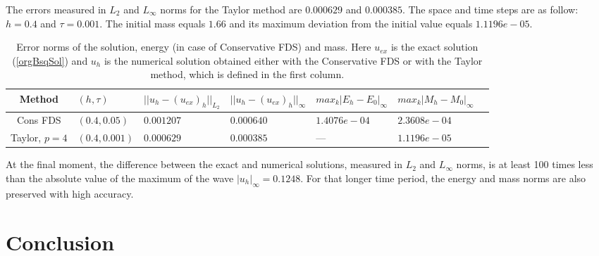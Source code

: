 \documentclass[%
 aip,
cp,  
 amsmath,amssymb,
 reprint,
]{iopconfser}
\newcommand{\rf}[1]{(\ref{#1})}
\begin{document}
The errors measured in $L_2$ and $L_\infty$ norms for the Taylor method are $0.000629$ and $0.000385$. The space and time steps are as follow: $h = 0.4$ and  $\tau = 0.001$. The initial mass equals $1.66$ and its maximum deviation from the initial value equals $1.1196e-05$.



\begin{table}[ht]
\centering
\small
		\begin{tabular}{|c|l|l|l|l|l|l|}
			\hline
Method                    & $(h, \tau)$   &    $||u_{h}-(u_{ex})_h||_{L_2}$  &    $||u_{h}-(u_{ex})_h||_{\infty}$  &   $max_k|E_{h}-E_0|_{\infty}$ &   $max_k|M_{h}-M_0|_{\infty}$       \\
			\hline
           Cons FDS          &  $(0.4,0.05)$  &  $ 0.001207$       &     $0.000640$               &     $1.4076e-04$           &               $2.3608e-04$     \\
			\hline
           Taylor, $p=4$       & $(0.4,0.001)$  &  $0.000629$     &      $0.000385$               &            ---           &               $1.1196e-05$     \\
			\hline
  		\end{tabular}
	\caption{Error norms of the solution, energy (in case of Conservative FDS) and mass. Here $u_{ex}$ is the exact solution \rf{orgBsqSol} and $u_{h}$ is the numerical solution obtained either with the Conservative FDS or with the Taylor method, which is defined in the first column.}
	\label{final35}
\end{table}

At the final moment, the difference between the exact and numerical solutions, measured in $L_2$ and $L_\infty$ norms, is at least 100 times less than the absolute value of the maximum of the wave $|u_h|_\infty = 0.1248$. For that longer time period, the energy and mass norms are also preserved with high accuracy.

\section{Conclusion}
\end{document}
